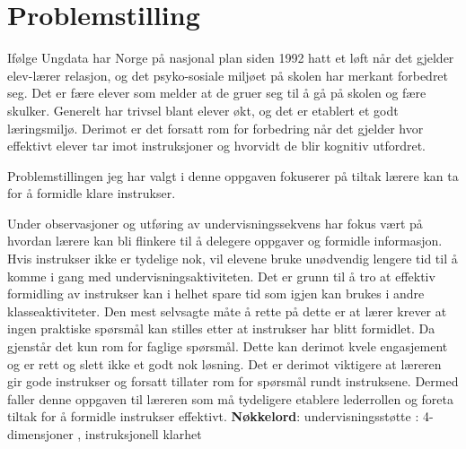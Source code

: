 \documentclass[main.tex]{subfiles}
\begin{document}
\section*{Problemstilling}      
If\o lge Ungdata har Norge p\aa\hspace{1mm} nasjonal plan siden 1992 hatt et l\o ft n\aa r det gjelder elev-l\ae rer 
relasjon, og det psyko-sosiale milj\o et p\aa\hspace{1mm} skolen har merkant 
forbedret seg. Det er f\ae re elever som melder at de gruer seg til \aa\hspace{1mm} 
g\aa\hspace{1mm} p\aa\hspace{1mm} skolen og f\ae re skulker. Generelt har trivsel 
blant elever \o kt, og det er etablert et godt l\ae ringsmilj\o . Derimot er det 
forsatt rom for forbedring n\aa r det gjelder hvor effektivt elever tar imot 
instruksjoner og hvorvidt de blir kognitiv utfordret. \newline

Problemstillingen jeg har valgt i denne oppgaven fokuserer  p\aa\hspace{1mm} tiltak 
l\ae rere kan ta for \aa\hspace{1mm} formidle klare instrukser. 
\newline

Under observasjoner og 
utf\o ring av undervisningssekvens har fokus v\ae rt p\aa\hspace{1mm} hvordan 
l\ae rere kan bli flinkere til \aa\hspace{1mm} delegere oppgaver og formidle 
informasjon. Hvis instrukser ikke er tydelige nok, vil elevene bruke un\o dvendig 
lengere tid til \aa\hspace{1mm} komme i gang med undervisningsaktiviteten. Det 
er grunn til \aa\hspace{1mm} tro at effektiv formidling av instrukser kan i 
helhet spare tid som igjen kan brukes i andre klasseaktiviteter. Den mest selvsagte m\aa te
\aa\hspace{1mm} rette p\aa\hspace{1mm} dette er at l\ae rer krever at ingen
praktiske
sp\o rsm\aa l kan stilles etter at instrukser har blitt formidlet. Da gjenst\aa r
det kun rom for faglige sp\o rsm\aa l. Dette kan derimot kvele engasjement og er
rett og slett ikke et godt nok l\o sning. Det er derimot viktigere at l\ae reren
gir gode instrukser og forsatt tillater rom for sp\o rsm\aa l rundt instruksene.
Dermed faller denne oppgaven til l\ae reren som m\aa\hspace{1mm} tydeligere
etablere lederrollen og foreta tiltak for \aa\hspace{1mm} formidle instrukser 
effektivt.
\newline
\newline
\hspace{-7mm}\textbf{N\o kkelord}: undervisningsst\o tte : 4-dimensjoner , 
instruksjonell klarhet       

\newpage\null
\end{document}
